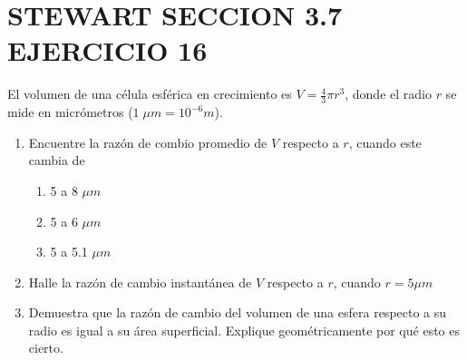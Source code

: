 \chapter*{STEWART SECCION 3.7 EJERCICIO 16}
El volumen de una célula esférica en crecimiento es $V=\frac{4}{3}\pi r^3$, donde el radio $r$ se mide en micrómetros ($1\;\mu m = 10^{-6}m$).
\begin{enumerate}[label=\alph*)]
	\item Encuentre la razón de combio promedio de $V$ respecto a $r$, cuando este cambia de
	      \begin{multicols}{6}
		      \noindent
		      \begin{enumerate}[label=\roman*)]
			      \item 5 a 8 $\mu m$
			            \columnbreak
			      \item 5 a 6 $\mu m$
			            \columnbreak
			      \item 5 a 5.1 $\mu m$
		      \end{enumerate}
	      \end{multicols}
	\item Halle la razón de cambio instantánea de $V$ respecto a $r$, cuando $r=5\mu m$
	\item Demuestra que la razón de cambio del volumen de una esfera respecto a su radio es igual a su área superficial.
	      Explique geométricamente por qué esto es cierto.
\end{enumerate}

